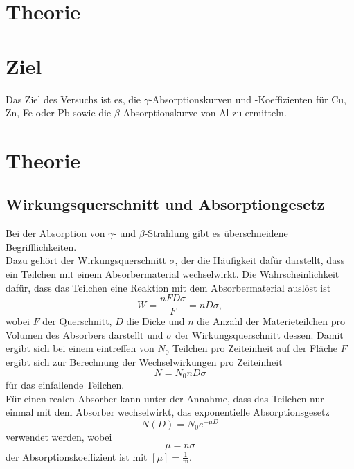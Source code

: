 \section{Theorie}
\label{sec:Theorie}

\section{Ziel}
Das Ziel des Versuchs ist es, die $\gamma$-Absorptionskurven und -Koeffizienten für Cu, Zn, Fe oder Pb sowie die $\beta$-Absorptionskurve von Al zu ermitteln.

\section{Theorie}
\subsection{Wirkungsquerschnitt und Absorptiongesetz}
Bei der Absorption von $\gamma$- und $\beta$-Strahlung gibt es überschneidene Begrifflichkeiten.\\
Dazu gehört der Wirkungsquerschnitt $\sigma$, der die Häufigkeit dafür darstellt, dass ein Teilchen mit einem Absorbermaterial wechselwirkt. Die Wahrscheinlichkeit dafür, dass das Teilchen eine Reaktion mit dem Absorbermaterial auslöst ist
\begin{equation*}
  W=\frac{nFD\sigma}{F}=nD\sigma,
\end{equation*}
wobei $F$ der Querschnitt, $D$ die Dicke und $n$ die Anzahl der Materieteilchen pro Volumen des Absorbers darstellt und $\sigma$ der Wirkungsquerschnitt dessen. 
Damit ergibt sich bei einem eintreffen von $N_0$ Teilchen pro Zeiteinheit auf der Fläche $F$ ergibt sich zur Berechnung der Wechselwirkungen pro Zeiteinheit 
\begin{equation*}
  N=N_0 nD\sigma
\end{equation*}
für das einfallende Teilchen.\\
Für einen realen Absorber kann unter der Annahme, dass das Teilchen nur einmal mit dem Absorber wechselwirkt, das exponentielle Absorptionsgesetz
\begin{equation}
  N(D)=N_0 e^{-\mu D}
  \label{eq:1}
\end{equation}
verwendet werden, wobei 
\begin{equation}
  \mu=n\sigma
  \label{eq:2}
\end{equation}
der Absorptionskoeffizient ist mit $[\mu]=\frac{1}{\textrm{m}}$.\\

